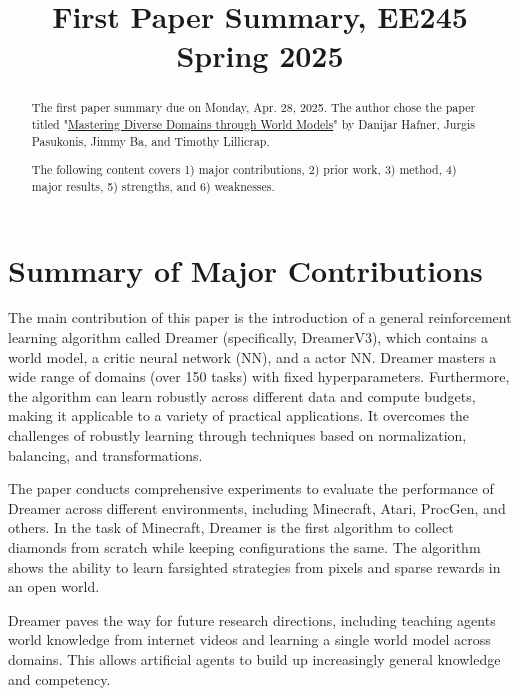 \documentclass{article}
\title{First Paper Summary, EE245 Spring 2025}
\begin{document}

\maketitle

\begin{abstract}
  The first paper summary due on Monday, Apr. 28, 2025. The author chose the paper titled "\underline{Mastering Diverse Domains through World Models}" by Danijar Hafner, Jurgis Pasukonis, Jimmy Ba, and Timothy Lillicrap.

  The following content covers 1) major contributions, 2) prior work, 3) method, 4) major results, 5) strengths, and 6) weaknesses.
\end{abstract}


\section{Summary of Major Contributions}

The main contribution of this paper \cite{hafner2023mastering} is the introduction of a general reinforcement learning algorithm called Dreamer (specifically, DreamerV3), which contains a world model, a critic neural network (NN), and a actor NN. Dreamer masters a wide range of domains (over 150 tasks) with fixed hyperparameters. Furthermore, the algorithm can learn robustly across different data and compute budgets, making it applicable to a variety of practical applications. It overcomes the challenges of robustly learning through techniques based on normalization, balancing, and transformations.

The paper conducts comprehensive experiments to evaluate the performance of Dreamer across different environments, including Minecraft, Atari, ProcGen, and others. In the task of Minecraft, Dreamer is the first algorithm to collect diamonds from scratch while keeping configurations the same. The algorithm shows the ability to learn farsighted strategies from pixels and sparse rewards in an open world.

Dreamer paves the way for future research directions, including teaching agents world knowledge from internet videos and learning a single world model across domains. This allows artificial agents to build up increasingly general knowledge and competency.
\end{document}
